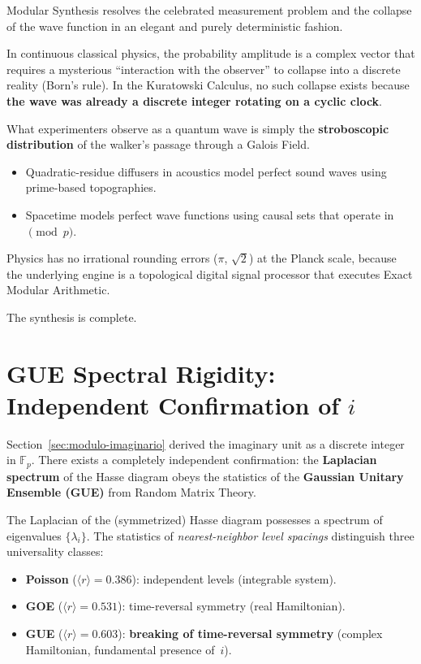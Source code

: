 Modular Synthesis resolves the celebrated measurement problem and the
collapse of the wave function in an elegant and purely deterministic
fashion.

In continuous classical physics, the probability amplitude is a complex
vector that requires a mysterious ``interaction with the observer'' to
collapse into a discrete reality (Born's rule). In the Kuratowski
Calculus, no such collapse exists because \textbf{the wave was already a
discrete integer rotating on a cyclic clock}.

What experimenters observe as a quantum wave is simply the
\textbf{stroboscopic distribution} of the walker's passage through a
Galois Field.
\begin{itemize}
  \item Quadratic-residue diffusers in acoustics model perfect sound
        waves using prime-based topographies.
  \item Spacetime models perfect wave functions using causal sets that
        operate in $\pmod p$.
\end{itemize}

Physics has no irrational rounding errors ($\pi$, $\sqrt{2}$) at the
Planck scale, because the underlying engine is a topological digital
signal processor that executes Exact Modular Arithmetic.

The synthesis is complete.

\section{GUE Spectral Rigidity: Independent Confirmation of $i$}
\label{sec:gue-spectral}

Section~\ref{sec:modulo-imaginario} derived the imaginary unit as a
discrete integer in $\mathbb{F}_p$. There exists a completely
independent confirmation: the \textbf{Laplacian spectrum} of the Hasse
diagram obeys the statistics of the \textbf{Gaussian Unitary Ensemble
(GUE)} from Random Matrix Theory.

The Laplacian of the (symmetrized) Hasse diagram possesses a spectrum of
eigenvalues $\{\lambda_i\}$. The statistics of \emph{nearest-neighbor
level spacings} distinguish three universality classes:
\begin{itemize}
  \item \textbf{Poisson} ($\langle r \rangle = 0{.}386$): independent
    levels (integrable system).
  \item \textbf{GOE} ($\langle r \rangle = 0{.}531$): time-reversal
    symmetry (real Hamiltonian).
  \item \textbf{GUE} ($\langle r \rangle = 0{.}603$): \textbf{breaking
    of time-reversal symmetry} (complex Hamiltonian, fundamental
    presence of~$i$).
\end{itemize}


